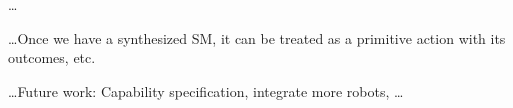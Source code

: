 
\ldots

\ldots Once we have a synthesized SM, it can be treated as a primitive action with its outcomes, etc.

\ldots Future work: Capability specification, integrate more robots, \ldots